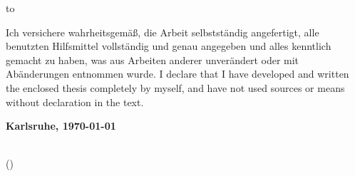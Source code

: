 \vspace*{36\baselineskip}
\hbox to \textwidth{\hrulefill}
\par
{}
  {Ich versichere wahrheitsgem\"a\ss, die Arbeit selbstst\"andig angefertigt, alle benutzten Hilfsmittel vollst\"andig und genau angegeben und alles kenntlich gemacht zu haben, was aus Arbeiten anderer unver\"andert oder mit Ab\"anderungen entnommen wurde.}
  {I declare that I have developed and written the enclosed thesis completely by myself, and have not used sources or means without declaration in the text.}

\textbf{Karlsruhe, \today}
\vspace{1.5cm}

\dotfill\hspace*{8.0cm}\\
\hspace*{2cm}(\textbf{\theauthor}) %

\thispagestyle{empty}
